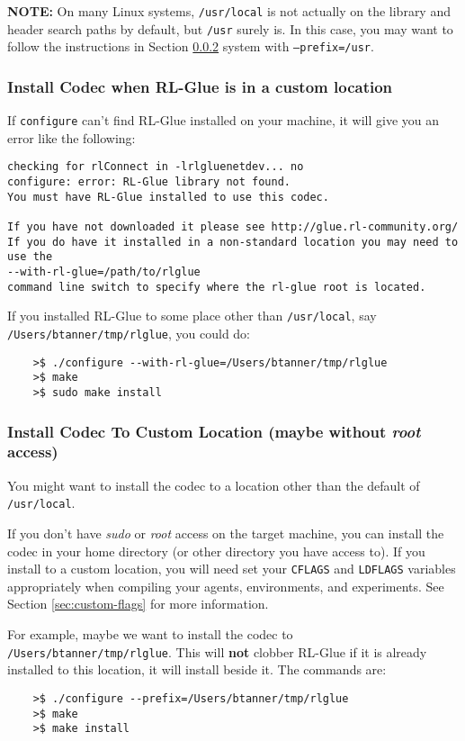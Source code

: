 \documentclass[11pt]{article}
\begin{document}
\textbf{NOTE:} On many Linux systems, \texttt{/usr/local} is not actually on the library and header search paths by default, but \texttt{/usr} surely is. In this case, you may want to follow the instructions in Section \ref{custom-install-location} system with \texttt{--prefix=/usr}.

\subsubsection{Install Codec when RL-Glue is in a custom location}

If \texttt{configure} can't find RL-Glue installed on your machine, it will give you an error like the following:
\begin{verbatim}
checking for rlConnect in -lrlgluenetdev... no
configure: error: RL-Glue library not found.
You must have RL-Glue installed to use this codec. 
	
If you have not downloaded it please see http://glue.rl-community.org/
If you do have it installed in a non-standard location you may need to use the 
--with-rl-glue=/path/to/rlglue 
command line switch to specify where the rl-glue root is located.
\end{verbatim}

If you installed RL-Glue to some place other than \texttt{/usr/local}, say \texttt{/Users/btanner/tmp/rlglue}, you could do:
\begin{verbatim}
	>$ ./configure --with-rl-glue=/Users/btanner/tmp/rlglue
	>$ make
	>$ sudo make install
\end{verbatim}

\subsubsection{Install Codec To Custom Location (maybe without \textit{root} access)}
\label{custom-install-location}
You might want to install the codec to a location other than the default of \texttt{/usr/local}.

If you don't have \textit{sudo} or \textit{root} access on the target machine, you can install the codec in your home directory (or other directory you have access to).
If you install to a custom location, you will need set your \texttt{CFLAGS} and \texttt{LDFLAGS} variables appropriately when compiling your agents, environments, and experiments. See Section \ref{sec:custom-flags} for more information.

For example, maybe we want to install the codec to \texttt{/Users/btanner/tmp/rlglue}.  This will \textbf{not} clobber RL-Glue if it is already installed to this location, it will install beside it.  The commands are:
\begin{verbatim}
	>$ ./configure --prefix=/Users/btanner/tmp/rlglue
	>$ make
	>$ make install
\end{verbatim}
\end{document}
